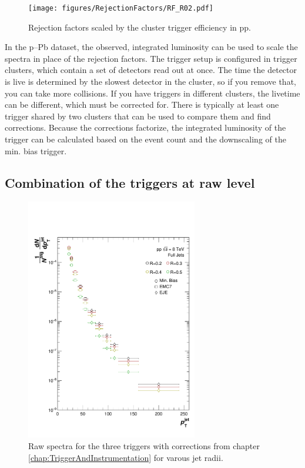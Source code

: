 \documentclass[ALICE]{ALICE_analysis_notes}
\newcommand{\pPb}{{\mbox{p--Pb}}\xspace}
\newcommand{\pp}{pp\xspace}
\providecommand{\DIFaddbeginFL}{} %
\providecommand{\DIFaddendFL}{} %
\providecommand{\DIFdelbeginFL}{} %
\providecommand{\DIFdelendFL}{} %
\newcommand{\DIFscaledelfig}{0.5}
\newlength{\DIFdelgraphicswidth} %
\newlength{\DIFdelgraphicsheight} %
\newcommand{\DIFaddincludegraphics}[2][]{{\color{blue}\fbox{\DIFOincludegraphics[#1]{#2}}}} %
\newcommand{\DIFdelincludegraphics}[2][]{%
\sbox{\DIFdelgraphicsbox}{\DIFOincludegraphics[#1]{#2}}%
\settoboxwidth{\DIFdelgraphicswidth}{\DIFdelgraphicsbox} %
\settoboxtotalheight{\DIFdelgraphicsheight}{\DIFdelgraphicsbox} %
\scalebox{\DIFscaledelfig}{%
\parbox[b]{\DIFdelgraphicswidth}{\usebox{\DIFdelgraphicsbox}\\[-\baselineskip] \rule{\DIFdelgraphicswidth}{0em}}\llap{\resizebox{\DIFdelgraphicswidth}{\DIFdelgraphicsheight}{%
\setlength{\unitlength}{\DIFdelgraphicswidth}%
\begin{picture}(1,1)%
\thicklines\linethickness{2pt} %
{\color[rgb]{1,0,0}\put(0,0){\framebox(1,1){}}}%
{\color[rgb]{1,0,0}\put(0,0){\line( 1,1){1}}}%
{\color[rgb]{1,0,0}\put(0,1){\line(1,-1){1}}}%
\end{picture}%
}\hspace*{3pt}}} %
} %
\DeclareRobustCommand{\DIFaddbeginFL}{\DIFOaddbeginFL \let\includegraphics\DIFaddincludegraphics} %
\DeclareRobustCommand{\DIFaddendFL}{\DIFOaddendFL \let\includegraphics\DIFOincludegraphics} %
\DeclareRobustCommand{\DIFdelbeginFL}{\DIFOdelbeginFL \let\includegraphics\DIFdelincludegraphics} %
\DeclareRobustCommand{\DIFdelendFL}{\DIFOaddendFL \let\includegraphics\DIFOincludegraphics} %
\begin{document}
\begin{figure}
    \centering
    \texttt{[image: figures/RejectionFactors/RF\_R02.pdf]}
    \caption{Rejection factors scaled by the cluster trigger efficiency in \pp.}
    \label{fig:RejectionFactors}
\end{figure}

In the \pPb dataset, the observed, integrated luminosity can be used to scale the spectra in place of the rejection factors. The trigger setup is configured in trigger clusters, which contain a set of detectors read out at once. The time the detector is live is determined by the slowest detector in the cluster, so if you remove that, you can take more collisions. If you have triggers in different clusters, the livetime can be different, which must be corrected for. There is typically at least one trigger shared by two clusters that can be used to compare them and find corrections. Because the corrections factorize, the integrated luminosity of the trigger can be calculated based on the event count and the downscaling of the min. bias trigger.

\subsection{Combination of the triggers at raw level}
\label{sec:triggerCombination}

\begin{figure}
    \centering
    \DIFdelbeginFL %
\DIFdelendFL \DIFaddbeginFL \includegraphics[width=7.5cm]{figures/CorrRawSpec/corrRawSpec.pdf}
    \DIFaddendFL \caption{Raw spectra for the three triggers with corrections from chapter \ref{chap:TriggerAndInstrumentation} for varous jet radii.}
    \label{fig:CorrRawSpec}
\end{figure}
\end{document}
